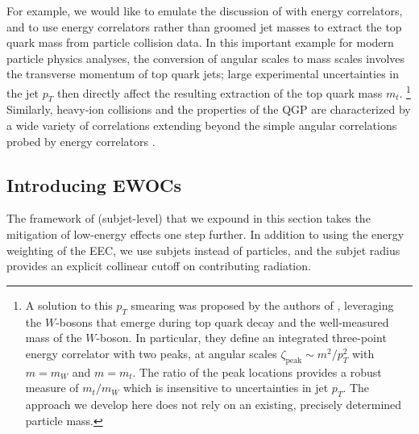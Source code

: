 For example, we would like to emulate the discussion of  with energy correlators, and to use energy correlators rather than groomed jet masses to extract the top quark mass from particle collision data.
%
In this important example for modern particle physics analyses, the conversion of angular scales to mass scales involves the transverse momentum of top quark jets;
%
large experimental uncertainties in the jet \(p_T\) then directly affect the resulting extraction of the top quark mass \(m_t\).%
\footnote{
    A solution to this \(p_T\) smearing was proposed by the authors of , leveraging the \(W\)-bosons that emerge during top quark decay and the well-measured mass of the \(W\)-boson.
    In particular, they define an integrated three-point energy correlator with two peaks, at angular scales \(\zeta_\text{peak} \sim m^2 / p_T^2\) with $m=m_W$ and $m=m_t$.
    The ratio of the peak locations provides a robust measure of \(m_t/m_W\) which is insensitive to uncertainties in jet \(p_T\).
    The approach we develop here does not rely on an existing, precisely determined particle mass.
}
%
Similarly, heavy-ion collisions and the properties of the QGP are characterized by a wide variety of correlations extending beyond the simple angular correlations probed by energy correlators \cite{Lokhtin:2004tx,Lokhtin:2006dp,Andres:2022ovj,Barata:2023zqg,Andres:2023xwr,Yang:2023dwc,Barata:2023vnl,Barata:2023bhh,Barata:2024nqo}.

\subsection{Introducing EWOCs}
\label{sec:ewoc-intro}



The framework of (subjet-level)  that we expound in this section takes the mitigation of low-energy effects one step further.
%
In addition to using the energy weighting of the EEC, we use subjets instead of particles, and the subjet radius provides an explicit collinear cutoff on contributing radiation.



